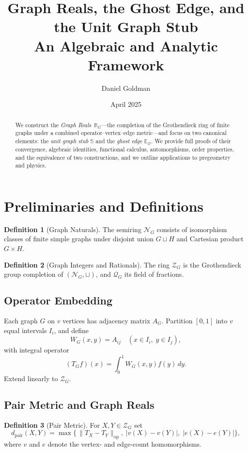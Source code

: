 \documentclass[11pt]{article}
\title{Graph Reals, the Ghost Edge, and the Unit Graph Stub\\An Algebraic and Analytic Framework}
\author{Daniel Goldman}
\date{April 2025}
\theoremstyle{definition}
\newtheorem{definition}{Definition}[section]
\theoremstyle{plain}
\theoremstyle{remark}
\newcommand{\stub}{\mathbb S}
\newcommand{\ghost}{\mathbb E_{\varnothing}}
\begin{document}
\maketitle

\begin{abstract}
We construct the \emph{Graph Reals}~$\mathbb R_G$—the completion of the Grothendieck ring of finite graphs under a combined operator–vertex–edge metric—and focus on two canonical elements: the \emph{unit graph stub} $\stub$ and the \emph{ghost edge} $\ghost$.  We provide full proofs of their convergence, algebraic identities, functional calculus, automorphisms, order properties, and the equivalence of two constructions, and we outline applications to pregeometry and physics.
\end{abstract}

\section{Preliminaries and Definitions}

\begin{definition}[Graph Naturals]
The semiring $\mathcal N_G$ consists of isomorphism classes of finite simple graphs under disjoint union $G\sqcup H$ and Cartesian product $G\times H$.
\end{definition}

\begin{definition}[Graph Integers and Rationals]
The ring $\mathcal Z_G$ is the Grothendieck group completion of $(\mathcal N_G,\sqcup)$, and $\mathcal Q_G$ its field of fractions.
\end{definition}

\subsection{Operator Embedding}
Each graph $G$ on $v$ vertices has adjacency matrix $A_G$.  Partition $[0,1]$ into $v$ equal intervals $I_i$, and define
\[
  W_G(x,y) = A_{ij}\quad(x\in I_i,\;y\in I_j),
\]
with integral operator
\[
  (T_Gf)(x)=\int_0^1 W_G(x,y)f(y)\,dy.
\]
Extend linearly to $\mathcal Z_G$.

\subsection{Pair Metric and Graph Reals}
\begin{definition}[Pair Metric]
For $X,Y\in\mathcal Z_G$ set
\[
  d_{\mathrm{pair}}(X,Y)
  = \max\bigl\{\,\|T_X-T_Y\|_{\mathrm{op}},\;|v(X)-v(Y)|,\;|e(X)-e(Y)|\bigr\},
\]
where $v$ and $e$ denote the vertex‐ and edge‐count homomorphisms.
\end{definition}
\end{document}
